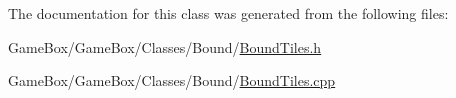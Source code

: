 \-The documentation for this class was generated from the following files\-:\begin{DoxyCompactItemize}
\item 
\-Game\-Box/\-Game\-Box/\-Classes/\-Bound/\hyperlink{_bound_tiles_8h}{\-Bound\-Tiles.\-h}\item 
\-Game\-Box/\-Game\-Box/\-Classes/\-Bound/\hyperlink{_bound_tiles_8cpp}{\-Bound\-Tiles.\-cpp}\end{DoxyCompactItemize}
